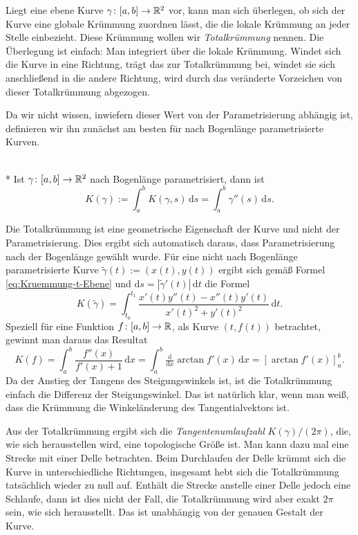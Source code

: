 Liegt eine ebene Kurve $\gamma\colon[a,b]\to\mathbb R^2$ vor, kann man sich
überlegen, ob sich der Kurve eine globale Krümmung zuordnen lässt,
die die lokale Krümmung an jeder Stelle einbezieht. Diese Krümmung
wollen wir \emph{Totalkrümmung} nennen. Die Überlegung
ist einfach: Man integriert über die lokale Krümmung. Windet sich
die Kurve in eine Richtung, trägt das zur Totalkrümmung bei, windet sie
sich anschließend in die andere Richtung, wird durch das veränderte
Vorzeichen von dieser Totalkrümmung abgezogen.

Da wir nicht wissen, inwiefern dieser Wert von der Parametrisierung
abhängig ist, definieren wir ihn zunächst am besten für nach Bogenlänge
parametrisierte Kurven.

\begin{definition}[Totalkrümmung]%
\mbox{}\\*
Ist $\gamma\colon [a,b]\to\mathbb R^2$ nach Bogenlänge parametrisiert, dann ist
\begin{equation}
K(\gamma) := \int_a^b K(\gamma,s)\,\mathrm ds
= \int_a^b \gamma''(s)\,\mathrm ds.
\end{equation}
\end{definition}
Die Totalkrümmung ist eine geometrische Eigenschaft der Kurve
und nicht der Parametrisierung. Dies ergibt sich automatisch
daraus, dass Parametrisierung nach der Bogenlänge gewählt wurde.
Für eine nicht nach Bogenlänge parametrisierte Kurve
$\tilde \gamma(t) := (x(t),y(t))$ ergibt sich gemäß Formel
\eqref{eq:Kruemmung-t-Ebene} und
$\mathrm ds = |\tilde \gamma'(t)|\,\mathrm dt$
die Formel
\begin{equation}
K(\tilde\gamma) = \int_{t_0}^{t_1}
\frac{x'(t)y''(t)-x''(t)y'(t)}{x'(t)^2+y'(t)^2}\,\mathrm dt.
\end{equation}
Speziell für eine Funktion $f\colon [a,b]\to\mathbb R$, als Kurve
$(t,f(t))$ betrachtet, gewinnt man daraus das Resultat
\begin{equation}
K(f) = \int_a^b \frac{f''(x)}{f'(x)+1}\,\mathrm dx
= \int_a^b \tfrac{\mathrm d}{\mathrm dx}\arctan f'(x)\,\mathrm dx
= [\arctan f'(x)]_a^b.
\end{equation}
Da der Anstieg der Tangens des Steigungswinkels ist, ist die
Totalkrümmung einfach die Differenz der Steigungswinkel.
Das ist natürlich klar, wenn man weiß, dass die Krümmung
die Winkeländerung des Tangentialvektors ist.

Aus der Totalkrümmung ergibt sich die
\emph{Tangentenumlaufzahl}
$K(\gamma)/(2\pi)$, die, wie sich herausstellen wird, eine topologische
Größe ist. Man kann dazu mal eine Strecke mit einer Delle
betrachten. Beim Durchlaufen der Delle krümmt sich die Kurve
in unterschiedliche Richtungen, insgesamt hebt sich die Totalkrümmung
tatsächlich wieder zu null auf. Enthält die Strecke anstelle
einer Delle jedoch eine Schlaufe, dann ist dies nicht der
Fall, die Totalkrümmung wird aber exakt $2\pi$ sein, wie sich
herausstellt. Das ist unabhängig von der genauen Gestalt der Kurve.

